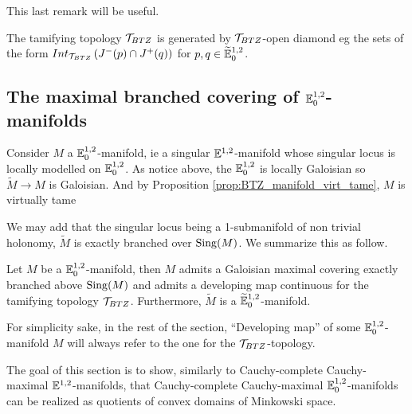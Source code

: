 This last remark will be useful.
\begin{rem}\label{rem:tamifying_topology_generated_open} The tamifying topology $\mathcal{T}_{BTZ}$ is generated by $\mathcal{T}_{BTZ}$-open diamond eg the sets of the form $Int_{\mathcal{T}_{BTZ}}\left(J^{-}(p)\cap J^{+}(q)\right)$ for $p,q\in {\widetilde {\mathbb{E}}}^{1,2}_0$.
\end{rem}






\subsection{The maximal branched covering of ${\mathbb E}^{1,2}_{0}$-manifolds}

Consider $M$ a ${\mathbb E}^{1,2}_{0}$-manifold, ie a singular ${\mathbb E}^{1,2}_{}$-manifold whose singular locus is locally modelled on ${\mathbb E}^{1,2}_{0}$. As notice above, the $\mathbb{E}^{1,2}_0$ is locally Galoisian so $\widetilde M\rightarrow M$ is Galoisian.
And by Proposition \ref{prop:BTZ_manifold_virt_tame}, $M$ is virtually tame 

We may add that the singular locus being a 1-submanifold of non trivial holonomy, $\widetilde M$ is exactly branched over $\mathrm{Sing}(M)$.
We summarize this as follow.
\begin{prop}\label{prop:manifold_admits_galoisian_maximal} Let $M$ be a ${\mathbb E}^{1,2}_{0}$-manifold, then $M$ admits a Galoisian maximal covering exactly branched above $\mathrm{Sing}(M)$ and admits a developing map continuous for the tamifying topology $\mathcal{T}_{BTZ}$.
Furthermore, $\widetilde M$ is a ${\widetilde {\mathbb{E}}}^{1,2}_0$-manifold.
\end{prop}
For simplicity sake, in the rest of the section, ``Developing map'' of some $\mathbb{E}^{1,2}_0$-manifold $M$ will always refer to the one for the $\mathcal{T}_{BTZ}$-topology.


The goal of this section is to show, similarly to Cauchy-complete Cauchy-maximal ${\mathbb E}^{1,2}_{}$-manifolds, that Cauchy-complete Cauchy-maximal ${\mathbb E}^{1,2}_{0}$-manifolds can be realized as quotients of convex domains of Minkowski space.


